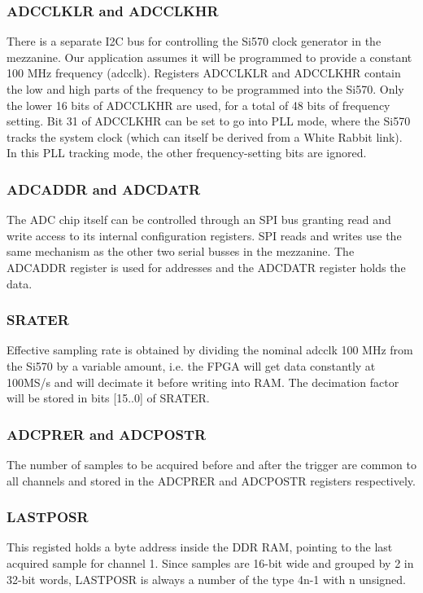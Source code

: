 \documentclass[a4paper]{article}
\begin{document}
\subsubsection{ADCCLKLR and ADCCLKHR}
\label{ss:adcclk}
There is a separate I2C bus for controlling the Si570 clock generator in the mezzanine. Our application assumes it will be programmed to provide a constant 100 MHz frequency (adcclk). Registers ADCCLKLR and ADCCLKHR contain the low and high parts of the frequency to be programmed into the Si570. Only the lower 16 bits of ADCCLKHR are used, for a total of 48 bits of frequency setting. Bit 31 of ADCCLKHR can be set to go into PLL mode, where the Si570 tracks the system clock (which can itself be derived from a White Rabbit link). In this PLL tracking mode, the other frequency-setting bits are ignored.

\subsubsection{ADCADDR and ADCDATR}
The ADC chip itself can be controlled through an SPI bus granting read and write access to its internal configuration registers. SPI reads and writes use the same mechanism as the other two serial busses in the mezzanine. The ADCADDR register is used for addresses and the ADCDATR register holds the data.

\subsubsection{SRATER}
Effective sampling rate is obtained by dividing the nominal adcclk 100 MHz from the Si570 by a variable amount, i.e. the FPGA will get data constantly at 100MS/s and will decimate it before writing into RAM. The decimation factor will be stored in bits [15..0] of SRATER.

\subsubsection{ADCPRER and ADCPOSTR}
The number of samples to be acquired before and after the trigger are common to all channels and stored in the ADCPRER and ADCPOSTR registers respectively.

\subsubsection{LASTPOSR}
This registed holds a byte address inside the DDR RAM, pointing to the last acquired sample for channel 1. Since samples are 16-bit wide and grouped by 2 in 32-bit words, LASTPOSR is always a number of the type 4n-1 with n unsigned.
\end{document}
